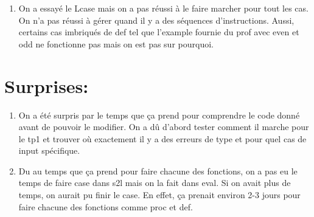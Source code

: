 \documentclass{article}
\begin{document}
\begin{enumerate}
     \item On a essayé le Lcase mais on a pas réussi à le faire marcher pour tout les cas. On n'a pas réussi à gérer quand il y a des séquences d'instructions. Aussi, certains cas imbriqués de def tel que l'example fournie du prof avec even et odd ne fonctionne pas mais on est pas sur pourquoi.



\end{enumerate}

\section*{Surprises:}
\begin{enumerate}
    \item On a été surpris par le temps que ça prend pour comprendre le code donné avant de pouvoir le modifier. On a dû d'abord tester comment il marche pour le tp1 et trouver où exactement il y a des erreurs de type et pour quel cas de input spécifique. 

    \item Du au temps que ça prend pour faire chacune des fonctions, on a pas eu le temps de faire case dans s2l mais on la fait dans eval. Si on avait plus de temps, on aurait pu finir le case. En effet, ça prenait environ 2-3 jours pour faire chacune des fonctions comme proc et def. 
    
\end{enumerate}
\end{document}
